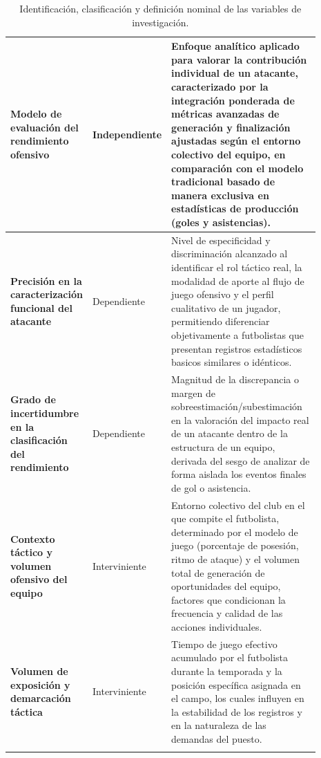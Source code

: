 \begin{longtable}{|>{\raggedright\arraybackslash}p{0.24\linewidth}|>{\raggedright\arraybackslash}p{0.17\linewidth}|>{\raggedright\arraybackslash}p{0.48\linewidth}|}
\textbf{Modelo de evaluación del rendimiento ofensivo} & Independiente & Enfoque analítico aplicado para valorar la contribución individual de un atacante, caracterizado por la integración ponderada de métricas avanzadas de generación y finalización ajustadas según el entorno colectivo del equipo, en comparación con el modelo tradicional basado de manera exclusiva en estadísticas de producción (goles y asistencias). \\ \hline
\textbf{Precisión en la caracterización funcional del atacante} & Dependiente & Nivel de especificidad y discriminación alcanzado al identificar el rol táctico real, la modalidad de aporte al flujo de juego ofensivo y el perfil cualitativo de un jugador, permitiendo diferenciar objetivamente a futbolistas que presentan registros estadísticos basicos similares o idénticos. \\ \hline
\textbf{Grado de incertidumbre en la clasificación del rendimiento} & Dependiente & Magnitud de la discrepancia o margen de sobreestimación/subestimación en la valoración del impacto real de un atacante dentro de la estructura de un equipo, derivada del sesgo de analizar de forma aislada los eventos finales de gol o asistencia. \\ \hline
\textbf{Contexto táctico y volumen ofensivo del equipo} & Interviniente & Entorno colectivo del club en el que compite el futbolista, determinado por el modelo de juego (porcentaje de posesión, ritmo de ataque) y el volumen total de generación de oportunidades del equipo, factores que condicionan la frecuencia y calidad de las acciones individuales. \\ \hline
\textbf{Volumen de exposición y demarcación táctica} & Interviniente & Tiempo de juego efectivo acumulado por el futbolista durante la temporada y la posición específica asignada en el campo, los cuales influyen en la estabilidad de los registros y en la naturaleza de las demandas del puesto. \\ \hline
\caption{Identificación, clasificación y definición nominal de las variables de investigación.} \label{tab:variables} \\
\end{longtable}
\endgroup
